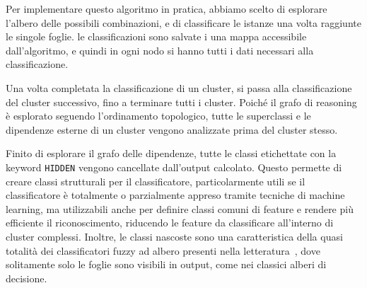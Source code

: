 Per implementare questo algoritmo in pratica, abbiamo scelto di esplorare l'albero delle possibili combinazioni, e di classificare le istanze una volta raggiunte le singole foglie. le classificazioni sono salvate i una mappa accessibile dall'algoritmo, e quindi in ogni nodo si hanno tutti i dati necessari alla classificazione.

Una volta completata la classificazione di un cluster, si passa alla classificazione del cluster successivo, fino a terminare tutti i cluster. Poiché il grafo di reasoning è esplorato seguendo l'ordinamento topologico, tutte le superclassi e le dipendenze esterne di un cluster vengono analizzate prima del cluster stesso.

Finito di esplorare il grafo delle dipendenze, tutte le classi etichettate con la keyword \verb|HIDDEN| vengono cancellate dall'output calcolato. Questo permette di creare classi strutturali per il classificatore, particolarmente utili se il classificatore è totalmente o parzialmente appreso tramite tecniche di machine learning, ma utilizzabili anche per definire classi comuni di feature e rendere più efficiente il riconoscimento, riducendo le feature da classificare all'interno di cluster complessi. Inoltre, le classi nascoste sono una caratteristica della quasi totalità dei classificatori fuzzy ad albero presenti nella letteratura~\cite{Yuan1995125}, dove solitamente solo le foglie sono visibili in output, come nei classici alberi di decisione.






